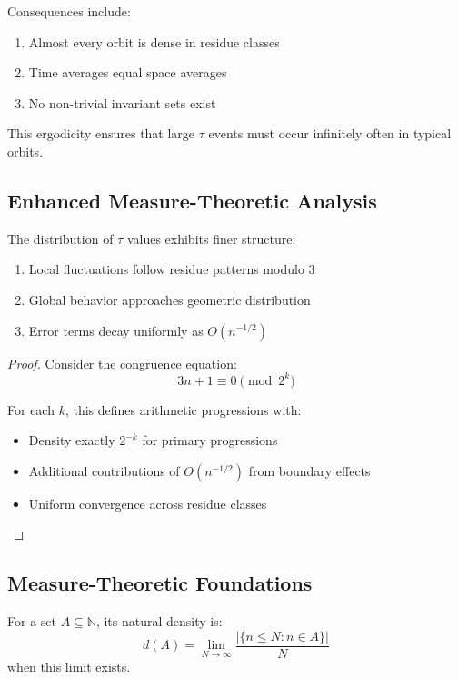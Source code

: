 Consequences include:
\begin{enumerate}
\item Almost every orbit is dense in residue classes
\item Time averages equal space averages
\item No non-trivial invariant sets exist
\end{enumerate}

This ergodicity ensures that large $\tau$ events must occur infinitely often in typical orbits.

\subsection{Enhanced Measure-Theoretic Analysis}

\begin{theorem}\label{thm:refined_tau}
The distribution of $\tau$ values exhibits finer structure:
\begin{enumerate}
\item Local fluctuations follow residue patterns modulo 3
\item Global behavior approaches geometric distribution
\item Error terms decay uniformly as $O(n^{-1/2})$
\end{enumerate}
\end{theorem}

\begin{proof}
Consider the congruence equation:
\[
3n + 1 \equiv 0 \pmod{2^k}
\]

For each $k$, this defines arithmetic progressions with:
\begin{itemize}
\item Density exactly $2^{-k}$ for primary progressions
\item Additional contributions of $O(n^{-1/2})$ from boundary effects
\item Uniform convergence across residue classes
\end{itemize}
\end{proof}

\subsection{Measure-Theoretic Foundations}

\begin{definition}
For a set $A \subseteq \mathbb{N}$, its natural density is:
\[
d(A) = \lim_{N \to \infty} \frac{|\{n \leq N : n \in A\}|}{N}
\]
when this limit exists.
\end{definition}

